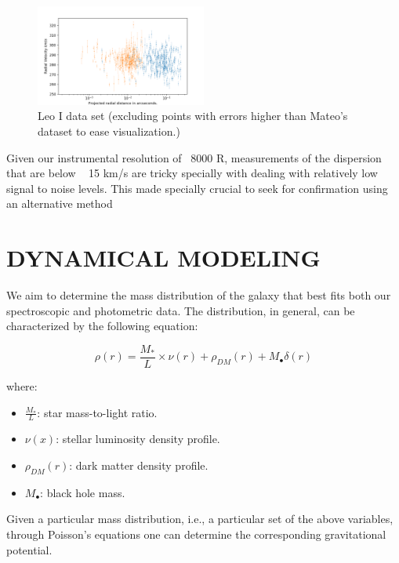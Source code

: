 \documentclass[%
 aip,
 twocolumn,
 jmp,%
 amsmath,amssymb,
 reprint,%
]{aastex61}
\begin{document}
\begin{figure}
\centering
\includegraphics[width=0.5\textwidth]{LEOVELS.png}
\caption{Leo I data set (excluding points with errors higher than Mateo's dataset to ease visualization.)}       
\end{figure}
    
    
    
    

Given our instrumental resolution of ~8000 R, measurements of the dispersion that are below ~ 15 km/s are tricky specially with dealing with relatively low signal to noise levels. This made specially crucial to seek for confirmation using an alternative method






\section{DYNAMICAL MODELING}

We aim to determine the mass distribution of the galaxy that best fits both our spectroscopic and photometric data. The distribution, in general, can be characterized by the following equation:

\begin{equation}
\rho(r)=\frac{M_*}{L}\times\nu(r)+\rho_{DM}(r)+M_\bullet \delta(r)
\end{equation}

where:
\renewcommand\labelitemi{\tiny$\bullet$}
\begin{itemize}
	\item $\frac{M_*}{L}$: star mass-to-light ratio.
	\item $\nu(x)$: stellar luminosity density profile.
	\item $\rho_{DM}(r)$: dark matter density profile.
	\item $M_\bullet$: black hole mass.
\end{itemize}

Given a particular mass distribution, i.e., a particular set of the above variables, through Poisson's equations one can determine the corresponding gravitational potential. 
\end{document}
